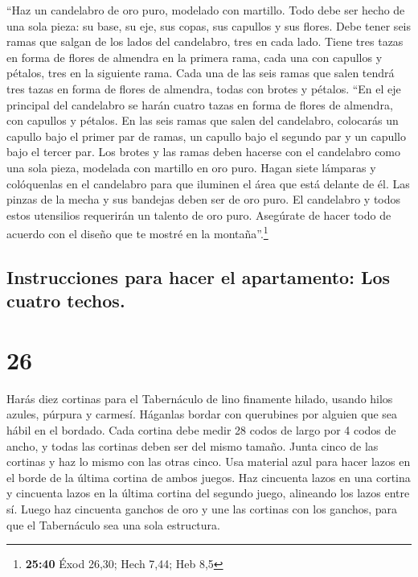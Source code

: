  ``Haz un candelabro de oro puro, modelado con martillo.
Todo debe ser hecho de una sola pieza: su base, su eje, sus copas, sus
capullos y sus flores.  Debe tener seis ramas que salgan
de los lados del candelabro, tres en cada lado.  Tiene
tres tazas en forma de flores de almendra en la primera rama, cada una
con capullos y pétalos, tres en la siguiente rama. Cada una de las seis
ramas que salen tendrá tres tazas en forma de flores de almendra, todas
con brotes y pétalos.  ``En el eje principal del
candelabro se harán cuatro tazas en forma de flores de almendra, con
capullos y pétalos.  En las seis ramas que salen del
candelabro, colocarás un capullo bajo el primer par de ramas, un capullo
bajo el segundo par y un capullo bajo el tercer par.  Los
brotes y las ramas deben hacerse con el candelabro como una sola pieza,
modelada con martillo en oro puro.  Hagan siete lámparas
y colóquenlas en el candelabro para que iluminen el área que está
delante de él.  Las pinzas de la mecha y sus bandejas
deben ser de oro puro.  El candelabro y todos estos
utensilios requerirán un talento de oro puro.  Asegúrate
de hacer todo de acuerdo con el diseño que te mostré en la
montaña''.\footnote{\textbf{25:40} Éxod 26,30; Hech 7,44; Heb 8,5}

\hypertarget{instrucciones-para-hacer-el-apartamento-los-cuatro-techos.}{%
\subsection{Instrucciones para hacer el apartamento: Los cuatro
techos.}\label{instrucciones-para-hacer-el-apartamento-los-cuatro-techos.}}

\hypertarget{section-25}{%
\section{26}\label{section-25}}

 Harás diez cortinas para el Tabernáculo de lino finamente
hilado, usando hilos azules, púrpura y carmesí. Háganlas bordar con
querubines por alguien que sea hábil en el bordado.  Cada
cortina debe medir 28 codos de largo por 4 codos de ancho, y todas las
cortinas deben ser del mismo tamaño.  Junta cinco de las
cortinas y haz lo mismo con las otras cinco.  Usa material
azul para hacer lazos en el borde de la última cortina de ambos juegos.
 Haz cincuenta lazos en una cortina y cincuenta lazos en
la última cortina del segundo juego, alineando los lazos entre sí.
 Luego haz cincuenta ganchos de oro y une las cortinas con
los ganchos, para que el Tabernáculo sea una sola estructura.

